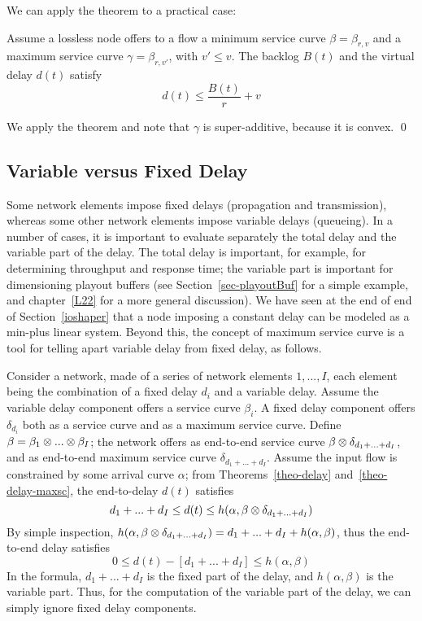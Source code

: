 We can apply the theorem to a practical case:
\begin{corollary}
Assume a lossless node offers to a flow a minimum service curve
$\beta=\beta_{r,v}$ and a maximum service curve
$\gamma=\beta_{r,v'}$, with $v'\leq v$. The backlog $B(t)$ and the
virtual delay $d(t)$ satisfy
 $$d(t) \leq \frac{B(t)}{r} + v
 $$
\end{corollary}
\pr
We apply the theorem and note that $\gamma$ is super-additive,
because it is convex. \qed
%

\subsection{Variable versus Fixed Delay}


Some network elements impose fixed delays (propagation and
transmission), whereas some other network elements impose variable
delays (queueing). In a number of cases, it is important to
evaluate separately the total delay and the variable part of the
delay. The total delay is important, for example, for determining
throughput and response time; the variable part is important for
dimensioning playout buffers (see Section~\ref{sec-playoutBuf} for
a simple example, and chapter~\ref{L22} for a more general
discussion). We have seen at the end of end of
Section~\ref{ioshaper} that a node imposing a constant delay can
be modeled as a min-plus linear system. Beyond this, the concept
of maximum service curve is a tool for telling apart variable
delay from fixed delay, as follows.

Consider a network, made of a series of network elements $1,...,
I$, each element being the combination of a fixed delay $d_i$ and
a variable delay. Assume the variable delay component offers a
service curve $\beta_i$. A fixed delay component offers
$\delta_{d_i}$ both as a service curve and as a maximum service
curve. Define $\beta = \beta_1 \otimes ... \otimes \beta_I$; the network
offers as end-to-end service curve
 $\beta  \otimes \delta_{d_1+...+d_I}$,
and as end-to-end maximum service curve $\delta_{d_1+...+d_I}$.
Assume the input flow is constrained by some arrival curve
$\alpha$; from Theorems~\ref{theo-delay}
and~\ref{theo-delay-maxsc}, the end-to-delay $d(t)$ satisfies
 $$d_1+...+d_I \leq d(t) \leq h(\alpha, \beta \otimes
 \delta_{d_1+...+d_I})
 $$
By simple inspection, $h(\alpha, \beta \otimes \delta_{d_1+...+d_I})=
d_1+...+d_I + h(\alpha, \beta)$, thus the end-to-end delay
satisfies
$$0 \leq d(t)- \left[d_1+...+d_I \right] \leq h(\alpha, \beta)
 $$
In the formula, $d_1+...+d_I$ is the fixed part of the delay, and
$ h(\alpha, \beta)$ is the variable part. Thus, for the
computation of the variable part of the delay, we can simply
ignore fixed delay components.

